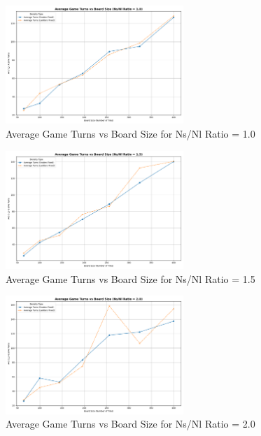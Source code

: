 \begin{figure}[ht]
	\centering
	\includegraphics[width=0.6\textwidth]{"../Chapter 4/Latest/plots_output/AvgTurnsVsBoardSize_ByRatio/AvgTurnsVsBoardSize_ByRatio_ns_nl_ratio-1_0"}
	\caption{Average Game Turns vs Board Size for Ns/Nl Ratio = 1.0}
	\label{fig:avgturns_vs_boardsize_ratio_1_0_avg_turns}
\end{figure}

\begin{figure}[ht]
	\centering
	\includegraphics[width=0.6\textwidth]{"../Chapter 4/Latest/plots_output/AvgTurnsVsBoardSize_ByRatio/AvgTurnsVsBoardSize_ByRatio_ns_nl_ratio-1_5"}
	\caption{Average Game Turns vs Board Size for Ns/Nl Ratio = 1.5}
	\label{fig:avgturns_vs_boardsize_ratio_1_5_avg_turns}
\end{figure}

\begin{figure}[ht]
	\centering
	\includegraphics[width=0.6\textwidth]{"../Chapter 4/Latest/plots_output/AvgTurnsVsBoardSize_ByRatio/AvgTurnsVsBoardSize_ByRatio_ns_nl_ratio-2_0"}
	\caption{Average Game Turns vs Board Size for Ns/Nl Ratio = 2.0}
	\label{fig:avgturns_vs_boardsize_ratio_2_0_avg_turns}
\end{figure}


